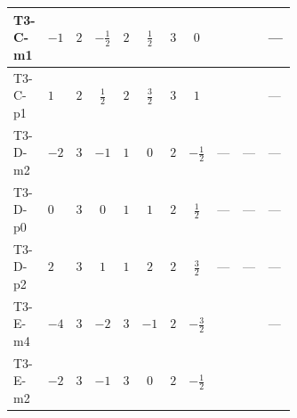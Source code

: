 \documentclass[8pt]{article}
\begin{document}
\begin{landscape}
\begin{longtable}{@{}llcccccc >{\raggedright\arraybackslash}p{0.21\linewidth} >{\raggedright\arraybackslash}p{0.21\linewidth} >{\raggedright\arraybackslash}p{0.21\linewidth}@{}}
\midrule
T3-C-m1 & $-1$ & $2$ & $-\frac{1}{2}$ & $2$ & $\frac{1}{2}$ & $3$ & $0$ & \scriptsize\adjustbox{max width=\linewidth}{$\begin{gathered} +8 {\lambda_{HS_2}^{(1)}} {\lambda_{HS_2}^{(A)}}\end{gathered}$} & \scriptsize\adjustbox{max width=\linewidth}{$\begin{gathered} +2 {\lambda_{HS_2}^{(A)}} {\lambda_{S_2}^{(1)}}\end{gathered}$} & --- \\
\midrule
T3-C-p1 & $1$ & $2$ & $\frac{1}{2}$ & $2$ & $\frac{3}{2}$ & $3$ & $1$ & \scriptsize\adjustbox{max width=\linewidth}{$\begin{gathered} +8 {\lambda_{HS_2}^{(1)}} {\lambda_{HS_2}^{(A)}}\end{gathered}$} & \scriptsize\adjustbox{max width=\linewidth}{$\begin{gathered} +2 {\lambda_{HS_2}^{(A)}} {\lambda_{S_2}^{(1)}}\end{gathered}$} & --- \\
\midrule
T3-D-m2 & $-2$ & $3$ & $-1$ & $1$ & $0$ & $2$ & $-\frac{1}{2}$ & --- & --- & --- \\
\midrule
T3-D-p0 & $0$ & $3$ & $0$ & $1$ & $1$ & $2$ & $\frac{1}{2}$ & --- & --- & --- \\
\midrule
T3-D-p2 & $2$ & $3$ & $1$ & $1$ & $2$ & $2$ & $\frac{3}{2}$ & --- & --- & --- \\
\midrule
T3-E-m4 & $-4$ & $3$ & $-2$ & $3$ & $-1$ & $2$ & $-\frac{3}{2}$ & \scriptsize\adjustbox{max width=\linewidth}{$\begin{gathered} +8 {\lambda_{HS_2}^{(1)}} {\lambda_{HS_2}^{(A)}}\end{gathered}$} & \scriptsize\adjustbox{max width=\linewidth}{$\begin{gathered} +2 {\lambda_{HS_2}^{(A)}} {\lambda_{S_2}^{(1)}}\end{gathered}$} & --- \\
\midrule
T3-E-m2 & $-2$ & $3$ & $-1$ & $3$ & $0$ & $2$ & $-\frac{1}{2}$ & \scriptsize\adjustbox{max width=\linewidth}{$\begin{gathered} +8 {\lambda_{HS_2}^{(1)}} {\lambda_{HS_2}^{(A)}}\end{gathered}$} & \scriptsize\adjustbox{max width=\linewidth}{$\begin{gathered} +2 {\lambda_{HS_2}^{(A)}} {\lambda_{S_2}^{(1)}}\end{gathered}$} & \scriptsize\adjustbox{max width=\linewidth}{$\begin{gathered} -\frac{3 {g_1}^2 {\lambda_{HS_2}^{(A)}}}{2}\end{gathered}$} \\

\end{longtable}
\end{landscape}
\end{document}
